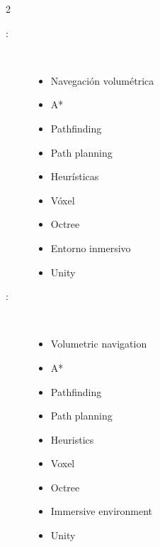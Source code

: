 \begin{multicols}{2}
\begin{description}
\item [\palabraschaveprincipal:] \mbox{} \\[-20pt]
  \begin{itemize}
    \item Navegación volumétrica
    \item A*
    \item Pathfinding
    \item Path planning
    \item Heurísticas
    \item Vóxel
    \item Octree
    \item Entorno inmersivo
    \item Unity
  \end{itemize}
\end{description}
\begin{description}
\item [\palabraschavesecundaria:] \mbox{} \\[-20pt]
  \begin{itemize}
    \item Volumetric navigation
    \item A*
    \item Pathfinding
    \item Path planning
    \item Heuristics
    \item Voxel
    \item Octree
    \item Immersive environment
    \item Unity
  \end{itemize}
\end{description}
\end{multicols}
